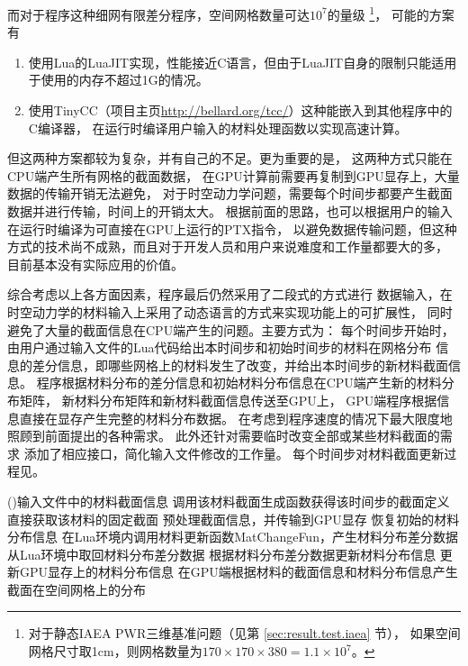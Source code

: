 而对于\ProgramName 程序这种细网有限差分程序，空间网格数量可达$10^7$的量级
\footnote{对于静态IAEA PWR三维基准问题（见第 \ref{sec:result.test.iaea} 节），
如果空间网格尺寸取1cm，则网格数量为$170\times170\times380=1.1\times10^7$。}，
可能的方案有
\begin{enumerate}
\item
使用Lua的LuaJIT实现，性能接近C语言，但由于LuaJIT自身的限制只能适用于使用的内存不超过1G的情况。

\item
使用TinyCC（项目主页\url{http://bellard.org/tcc/}）这种能嵌入到其他程序中的C编译器，
在运行时编译用户输入的材料处理函数以实现高速计算。
\end{enumerate}
但这两种方案都较为复杂，并有自己的不足。更为重要的是，
这两种方式只能在CPU端产生所有网格的截面数据，
在GPU计算前需要再复制到GPU显存上，大量数据的传输开销无法避免，
对于时空动力学问题，需要每个时间步都要产生截面数据并进行传输，时间上的开销太大。
根据前面的思路，也可以根据用户的输入在运行时编译为可直接在GPU上运行的PTX指令，
以避免数据传输问题，但这种方式的技术尚不成熟，而且对于开发人员和用户来说难度和工作量都要大的多，
目前基本没有实际应用的价值。

综合考虑以上各方面因素，\ProgramName 程序最后仍然采用了二段式的方式进行
数据输入，在时空动力学的材料输入上采用了动态语言的方式来实现功能上的可扩展性，
同时避免了大量的截面信息在CPU端产生的问题。主要方式为：
每个时间步开始时，由用户通过输入文件的Lua代码给出本时间步和初始时间步的材料在网格分布
信息的差分信息，即哪些网格上的材料发生了改变，并给出本时间步的新材料截面信息。
程序根据材料分布的差分信息和初始材料分布信息在CPU端产生新的材料分布矩阵，
新材料分布矩阵和新材料截面信息传送至GPU上，
GPU端程序根据信息直接在显存产生完整的材料分布数据。
在考虑到程序速度的情况下最大限度地照顾到前面提出的各种需求。
此外\ProgramName 还针对需要临时改变全部或某些材料截面的需求
添加了相应接口，简化输入文件修改的工作量。
每个时间步\ProgramName 对材料截面更新过程见。

\begin{algorithm}
\ForEach(){输入文件中的材料截面信息}
{
  {
  调用该材料截面生成函数获得该时间步的截面定义\;
  }
  \Else
  {
  直接获取该材料的固定截面\;
}
}
预处理截面信息，并传输到GPU显存\;
{
  {
    恢复初始的材料分布信息\;
  }
  在Lua环境内调用材料更新函数MatChangeFun，产生材料分布差分数据\;
  从Lua环境中取回材料分布差分数据\;
  根据材料分布差分数据更新材料分布信息\;
  更新GPU显存上的材料分布信息\;
}
在GPU端根据材料的截面信息和材料分布信息产生截面在空间网格上的分布\;
\caption{\label{alg:program.material.update}每个时间步\ProgramName 对材料截面更新过程}
\end{algorithm}

